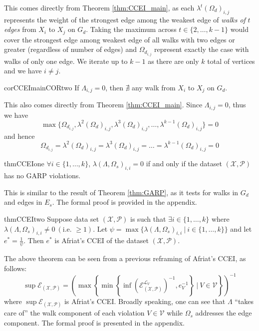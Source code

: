 \documentclass{article} %
\theoremstyle{style1}
\theoremstyle{style1}
\theoremstyle{example}
\begin{document}
This comes directly from Theorem \ref{thm:CCEI_main}, as each $\lambda^t(\Omega_d)_{i,j}$ represents the weight of the strongest edge among the weakest edge of \textit{walks of} $t$ \textit{edges} from $X_i$ to $X_j$ on $G_d$. Taking the maximum across $t\in\{2,\ldots,k-1\}$ would cover the strongest edge among weakest edge of all walks with two edges or greater (regardless of number of edges) and $\Omega_{d_{i,j}}$ represent exactly the case with walks of only one edge. We iterate up to $k-1$ as there are only $k$ total of vertices and we have $i\not=j$.

\begin{restatable}{cor}{CCEImainCORtwo}\label{cor:CCEI_mainCor2}
If $\Lambda_{i,j}=0$, then $\nexists$ any walk from $X_i$ to $X_j$ on $G_d$.
\end{restatable}

This also comes directly from Theorem \ref{thm:CCEI_main}. Since $\Lambda_{i,j}=0$, thus we have $$\max\{\Omega_{d_{i,j}},\lambda^2(\Omega_d)_{i,j},\lambda^3(\Omega_d)_{i,j},\ldots,\lambda^{k-1}(\Omega_d)_{i,j}\}=0$$ 
and hence 
$$\Omega_{d_{i,j}}=\lambda^2(\Omega_d)_{i,j}=\lambda^3(\Omega_d)_{i,j}=\ldots=\lambda^{k-1}(\Omega_d)_{i,j}=0$$

\begin{restatable}{thm}{CCEIone}
\label{thm:CCEI_1}
$\forall i\in\{1,\ldots,k\}$, $\lambda(\Lambda,\Omega_s)_{i,i}=0$ if and only if the dataset $(\mathcal{X},\mathcal{P})$ has no GARP violations. 
\end{restatable}

This is similar to the result of Theorem \ref{thm:GARP}, as it tests for walks in $G_d$ and edges in $E_s$. The formal proof is provided in the appendix. 

\begin{restatable}{thm}{CCEItwo}
\label{thm:CCEI_2}
Suppose data set $(\mathcal{X},\mathcal{P})$ is such that $\exists i\in\{1,\ldots,k\}$ where $\lambda(\Lambda,\Omega_s)_{i,i}\not=0\ (\textrm{i.e. }\geq1)$. Let $\psi = \max\big\{\lambda(\Lambda,\Omega_s)_{i,i}\ |\ i\in\{1,\ldots,k\}\big\}$ and let $e^*=\frac{1}{\psi}$. Then $e^*$ is Afriat's CCEI of the dataset $(\mathcal{X},\mathcal{P})$.
\end{restatable}

The above theorem can be seen from a previous reframing of Afriat's CCEI, as follows:
$$\sup \mathcal{E}_{(\mathcal{X},\mathcal{P})}  = \left(\max\left\{\min\left\{\inf\left(\mathcal{E}^{\mathcal{L}_V}_{(\mathcal{X},\mathcal{P})}\right)^{-1},e_V^{-1}\right\}\ |\ V\in\mathcal{V}\right\}\right)^{-1}$$
where $\sup \mathcal{E}_{(\mathcal{X},\mathcal{P})}$ is Afriat's CCEI. Broadly speaking, one can see that $\Lambda$ ``takes care of'' the walk component of each violation $V\in\mathcal{V}$ while $\Omega_s$ addresses the edge component. The formal proof is presented in the appendix.
\end{document}
